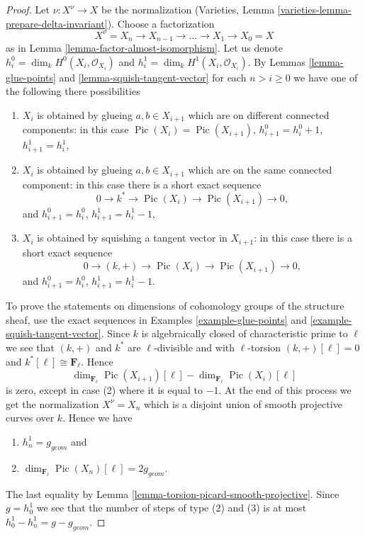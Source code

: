\documentclass{stacks-project}
\theoremstyle{plain}
\theoremstyle{definition}
\theoremstyle{remark}
\numberwithin{equation}{subsection}
\def\Pic{\mathop{\mathrm{Pic}}\nolimits}
\begin{document}
\begin{proof}
Let $\nu : X^\nu \to X$ be the normalization
(Varieties, Lemma \ref{varieties-lemma-prepare-delta-invariant}).
Choose a factorization
$$
X^\nu = X_n \to X_{n - 1} \to \ldots \to X_1 \to X_0 = X
$$
as in Lemma \ref{lemma-factor-almost-isomorphism}.
Let us denote $h^0_i = \dim_k H^0(X_i, \mathcal{O}_{X_i})$
and $h^1_i = \dim_k H^1(X_i, \mathcal{O}_{X_i})$.
By Lemmas \ref{lemma-glue-points} and \ref{lemma-squish-tangent-vector}
for each $n > i \geq 0$ we have
one of the following there possibilities
\begin{enumerate}
\item $X_i$ is obtained by glueing $a, b \in X_{i + 1}$
which are on different connected components: in this case
$\Pic(X_i) = \Pic(X_{i + 1})$,
$h^0_{i + 1} = h^0_i + 1$, $h^1_{i + 1} = h^1_i$,
\item $X_i$ is obtained by glueing $a, b \in X_{i + 1}$
which are on the same connected component: in this case
there is a short exact sequence
$$
0 \to k^* \to \Pic(X_i) \to \Pic(X_{i + 1}) \to 0,
$$
and $h^0_{i + 1} = h^0_i$, $h^1_{i + 1} = h^1_i - 1$,
\item $X_i$ is obtained by squishing a tangent vector in $X_{i + 1}$:
in this case there is a short exact sequence
$$
0 \to (k, +) \to \Pic(X_i) \to \Pic(X_{i + 1}) \to 0,
$$
and $h^0_{i + 1} = h^0_i$, $h^1_{i + 1} = h^1_i - 1$.
\end{enumerate}
To prove the statements on dimensions of cohomology groups of the
structure sheaf, use the exact sequences in
Examples \ref{example-glue-points} and \ref{example-squish-tangent-vector}.
Since $k$ is algebraically closed of characteristic prime to $\ell$
we see that $(k, +)$ and $k^*$ are $\ell$-divisible and with
$\ell$-torsion $(k, +)[\ell] = 0$ and $k^*[\ell] \cong \mathbf{F}_\ell$.
Hence
$$
\dim_{\mathbf{F}_\ell} \Pic(X_{i + 1})[\ell] -
\dim_{\mathbf{F}_\ell}\Pic(X_i)[\ell]
$$
is zero, except in case (2) where it is equal to $-1$.
At the end of this process we get the normalization
$X^\nu = X_n$ which is a disjoint union of smooth projective
curves over $k$. Hence we have
\begin{enumerate}
\item $h^1_n = g_{geom}$ and
\item $\dim_{\mathbf{F}_\ell} \Pic(X_n)[\ell] = 2g_{geom}$.
\end{enumerate}
The last equality by Lemma \ref{lemma-torsion-picard-smooth-projective}.
Since $g = h^1_0$ we see that the number of steps of type
(2) and (3) is at most $h^1_0 - h^1_n = g - g_{geom}$.

\end{proof}
\end{document}
